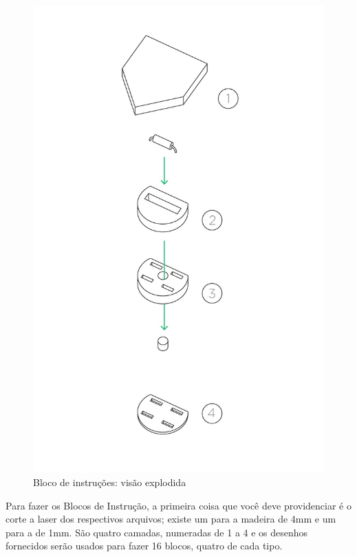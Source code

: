 \documentclass[paper=a4, fontsize=11pt]{scrartcl} %
\numberwithin{equation}{section} %
\numberwithin{figure}{section} %
\numberwithin{table}{section} %
\begin{document}
\begin{figure}[h] %
  \centering
  \includegraphics[scale=0.10]{./imagens/instruction-esploso.jpg}
  \caption[ ]{Bloco de instruções: visão explodida }
  \label{fig:bloco explodido}
\end{figure}

Para fazer os Blocos de Instrução, a primeira coisa que você deve providenciar é o corte a laser dos respectivos arquivos; existe um para a madeira de 4mm e um para a de 1mm. São quatro camadas, numeradas de 1 a 4 e os desenhos fornecidos serão usados para fazer 16 blocos, quatro de cada tipo.
\end{document}
